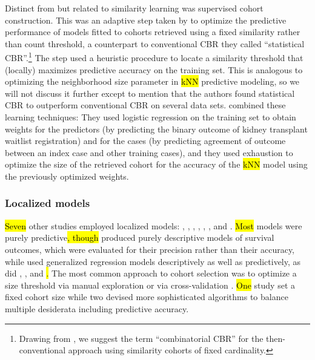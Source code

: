 \documentclass[sn-mathphys,Numbered,pdflatex]{sn-jnl}
\theoremstyle{remark}
\theoremstyle{definition}
\begin{document}
Distinct from but related to similarity learning was supervised cohort
construction. This was an adaptive step taken by \citet{Park2006} to
optimize the predictive performance of models fitted to cohorts
retrieved using a fixed similarity rather than count threshold, a
counterpart to conventional CBR they called ``statistical
CBR''.\footnote{Drawing from \citet{Goyal2008}, we suggest the term
  ``combinatorial CBR'' for the then-conventional approach using
  similarity cohorts of fixed cardinality.} The step used a heuristic
procedure to locate a similarity threshold that (locally) maximizes
predictive accuracy on the training set. This is analogous to optimizing
the neighborhood size parameter in \hl{kNN} predictive modeling, so we
will not discuss it further except to mention that the authors found
statistical CBR to outperform conventional CBR on several data sets.
\citet{CampilloGimenez2013} combined these learning techniques: They
used logistic regression on the training set to obtain weights for the
predictors (by predicting the binary outcome of kidney transplant
waitlist registration) and for the cases (by predicting agreement of
outcome between an index case and other training cases), and they used
exhaustion to optimize the size of the retrieved cohort for the accuracy
of the \hl{kNN} model using the previously optimized weights.

\subsubsection{Localized models}\label{localized-models}

\hl{Seven} other studies employed localized models:
\citet{Mariuzzi1997}, \citet{Lee2015}, \citet{Verma2015},
\citet{Wang2019}, \citet{Ma2020}, \citet{Liu2022}, and
\citet{Doborjeh2022}. \hl{Most} models were purely
predictive\hl{, though} \citet{Mariuzzi1997} produced purely descriptive
models of survival outcomes, which were evaluated for their precision
rather than their accuracy, while \citet{Ng2015} used generalized
regression models descriptively as well as predictively, as did
\citet{Tang2021}, \citet{Ng2021}, and \citet{Liu2022}\hl{.} The most
common approach to cohort selection was to optimize a size threshold via
manual exploration
\citep{Mariuzzi1997, Lee2015, Ng2015, Lee2017, Wang2019, Vilhena2016} or
via cross-validation \citep{Lowsky2013, Verma2015}. \hl{One} study
\citep{Ma2020} set a fixed cohort size while two
\citep{Liang2015, Tang2021, Ng2021} devised more sophisticated
algorithms to balance multiple desiderata including predictive accuracy.
\end{document}
